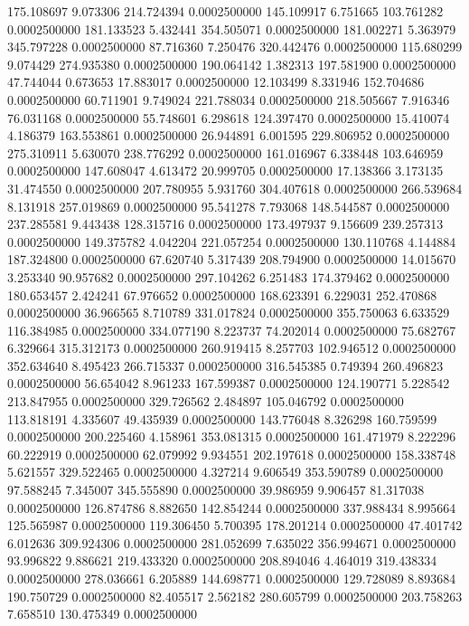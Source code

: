 175.108697 9.073306 214.724394 0.0002500000
145.109917 6.751665 103.761282 0.0002500000
181.133523 5.432441 354.505071 0.0002500000
181.002271 5.363979 345.797228 0.0002500000
87.716360 7.250476 320.442476 0.0002500000
115.680299 9.074429 274.935380 0.0002500000
190.064142 1.382313 197.581900 0.0002500000
47.744044 0.673653 17.883017 0.0002500000
12.103499 8.331946 152.704686 0.0002500000
60.711901 9.749024 221.788034 0.0002500000
218.505667 7.916346 76.031168 0.0002500000
55.748601 6.298618 124.397470 0.0002500000
15.410074 4.186379 163.553861 0.0002500000
26.944891 6.001595 229.806952 0.0002500000
275.310911 5.630070 238.776292 0.0002500000
161.016967 6.338448 103.646959 0.0002500000
147.608047 4.613472 20.999705 0.0002500000
17.138366 3.173135 31.474550 0.0002500000
207.780955 5.931760 304.407618 0.0002500000
266.539684 8.131918 257.019869 0.0002500000
95.541278 7.793068 148.544587 0.0002500000
237.285581 9.443438 128.315716 0.0002500000
173.497937 9.156609 239.257313 0.0002500000
149.375782 4.042204 221.057254 0.0002500000
130.110768 4.144884 187.324800 0.0002500000
67.620740 5.317439 208.794900 0.0002500000
14.015670 3.253340 90.957682 0.0002500000
297.104262 6.251483 174.379462 0.0002500000
180.653457 2.424241 67.976652 0.0002500000
168.623391 6.229031 252.470868 0.0002500000
36.966565 8.710789 331.017824 0.0002500000
355.750063 6.633529 116.384985 0.0002500000
334.077190 8.223737 74.202014 0.0002500000
75.682767 6.329664 315.312173 0.0002500000
260.919415 8.257703 102.946512 0.0002500000
352.634640 8.495423 266.715337 0.0002500000
316.545385 0.749394 260.496823 0.0002500000
56.654042 8.961233 167.599387 0.0002500000
124.190771 5.228542 213.847955 0.0002500000
329.726562 2.484897 105.046792 0.0002500000
113.818191 4.335607 49.435939 0.0002500000
143.776048 8.326298 160.759599 0.0002500000
200.225460 4.158961 353.081315 0.0002500000
161.471979 8.222296 60.222919 0.0002500000
62.079992 9.934551 202.197618 0.0002500000
158.338748 5.621557 329.522465 0.0002500000
4.327214 9.606549 353.590789 0.0002500000
97.588245 7.345007 345.555890 0.0002500000
39.986959 9.906457 81.317038 0.0002500000
126.874786 8.882650 142.854244 0.0002500000
337.988434 8.995664 125.565987 0.0002500000
119.306450 5.700395 178.201214 0.0002500000
47.401742 6.012636 309.924306 0.0002500000
281.052699 7.635022 356.994671 0.0002500000
93.996822 9.886621 219.433320 0.0002500000
208.894046 4.464019 319.438334 0.0002500000
278.036661 6.205889 144.698771 0.0002500000
129.728089 8.893684 190.750729 0.0002500000
82.405517 2.562182 280.605799 0.0002500000
203.758263 7.658510 130.475349 0.0002500000
